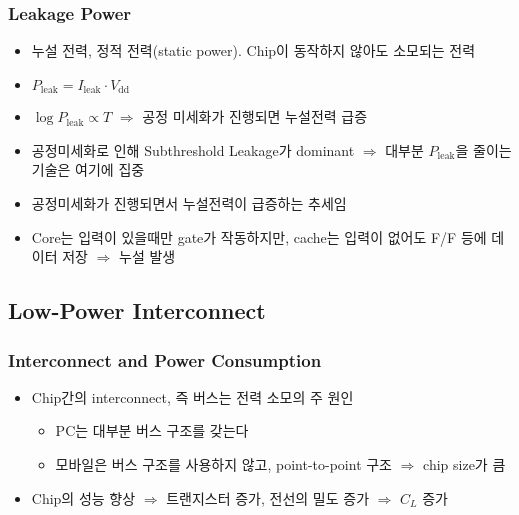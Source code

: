 \subsubsection*{Leakage Power}
\begin{itemize}
    \item 누설 전력, 정적 전력(static power). Chip이 동작하지 않아도 소모되는 전력
    \item $P_{\mathrm{leak}} = I_{\mathrm{leak}} \cdot V_{\mathrm{dd}}$
    \item $\log P_{\mathrm{leak}} \varpropto T$ $\Rightarrow$ 공정 미세화가 진행되면 누설전력 급증
    \item 공정미세화로 인해 Subthreshold Leakage가 dominant $\Rightarrow$ 대부분 $P_{\mathrm{leak}}$을 줄이는 기술은 여기에 집중
    \begin{figures}
    \end{figures}
    \item 공정미세화가 진행되면서 누설전력이 급증하는 추세임
    \item Core는 입력이 있을때만 gate가 작동하지만, cache는 입력이 없어도 F/F 등에 데이터 저장 $\Rightarrow$ 누설 발생
\end{itemize}
\pagebreak

\subsection{Low-Power Interconnect}

\subsubsection*{Interconnect and Power Consumption}
\begin{itemize}
    \item Chip간의 interconnect, 즉 버스는 전력 소모의 주 원인
    \begin{itemize}
        \item PC는 대부분 버스 구조를 갖는다
        \item 모바일은 버스 구조를 사용하지 않고, point-to-point 구조 $\Rightarrow$ chip size가 큼
    \end{itemize}
    \item Chip의 성능 향상 $\Rightarrow$ 트랜지스터 증가, 전선의 밀도 증가 $\Rightarrow$ $C_L$ 증가
\end{itemize}

